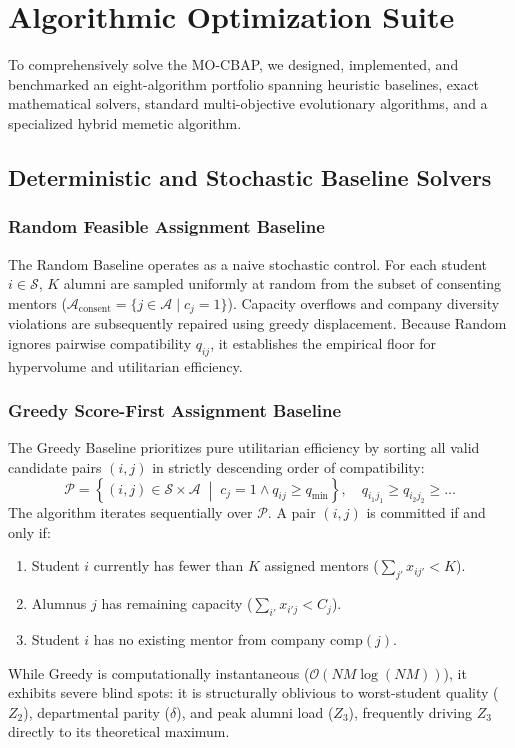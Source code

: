 \chapter{Algorithmic Optimization Suite}
\label{ch:algorithms}

To comprehensively solve the MO-CBAP, we designed, implemented, and benchmarked an eight-algorithm portfolio spanning heuristic baselines, exact mathematical solvers, standard multi-objective evolutionary algorithms, and a specialized hybrid memetic algorithm.

\section{Deterministic and Stochastic Baseline Solvers}

\subsection{Random Feasible Assignment Baseline}
The Random Baseline operates as a naive stochastic control. For each student $i \in \mathcal{S}$, $K$ alumni are sampled uniformly at random from the subset of consenting mentors ($\mathcal{A}_{\text{consent}} = \{j \in \mathcal{A} \mid c_j = 1\}$). Capacity overflows and company diversity violations are subsequently repaired using greedy displacement. Because Random ignores pairwise compatibility $q_{ij}$, it establishes the empirical floor for hypervolume and utilitarian efficiency.

\subsection{Greedy Score-First Assignment Baseline}
The Greedy Baseline prioritizes pure utilitarian efficiency by sorting all valid candidate pairs $(i, j)$ in strictly descending order of compatibility:
\begin{equation}
    \mathcal{P} = \left\{ (i, j) \in \mathcal{S} \times \mathcal{A} \;\middle|\; c_j = 1 \land q_{ij} \ge q_{\min} \right\}, \quad q_{i_1 j_1} \ge q_{i_2 j_2} \ge \dots
\end{equation}
The algorithm iterates sequentially over $\mathcal{P}$. A pair $(i, j)$ is committed if and only if:
\begin{enumerate}
    \item Student $i$ currently has fewer than $K$ assigned mentors ($\sum_{j'} x_{ij'} < K$).
    \item Alumnus $j$ has remaining capacity ($\sum_{i'} x_{i'j} < C_j$).
    \item Student $i$ has no existing mentor from company $\text{comp}(j)$.
\end{enumerate}
While Greedy is computationally instantaneous ($\mathcal{O}(NM \log(NM))$), it exhibits severe blind spots: it is structurally oblivious to worst-student quality ($Z_2$), departmental parity ($\delta$), and peak alumni load ($Z_3$), frequently driving $Z_3$ directly to its theoretical maximum.

